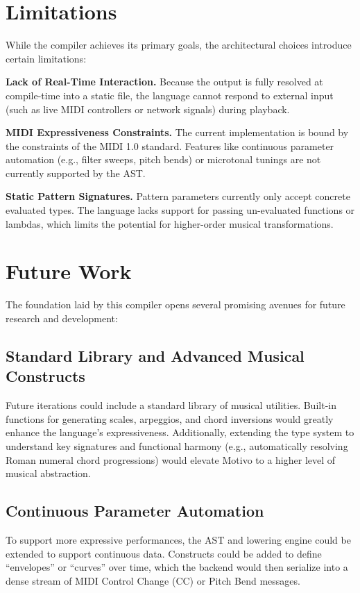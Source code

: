 \section{Limitations}\label{detail-sec:limitations}

While the compiler achieves its primary goals, the architectural choices introduce certain limitations:

\noindent \textbf{Lack of Real-Time Interaction.} Because the output is fully resolved at compile-time into a
static file,
the language cannot respond to external input (such as live MIDI controllers or network signals) during playback.

\noindent \textbf{MIDI Expressiveness Constraints.} The current implementation is bound by the constraints of
the MIDI 1.0
standard.
Features like continuous parameter automation (e.g., filter sweeps, pitch bends) or microtonal tunings are not
currently supported by the AST\@.

\noindent \textbf{Static Pattern Signatures.} Pattern parameters currently only accept concrete evaluated types.
The language lacks support for passing un-evaluated functions or lambdas, which limits the potential for
higher-order musical transformations.

\section{Future Work}\label{detail-sec:future-work}

The foundation laid by this compiler opens several promising avenues for future research and development:

\subsection{Standard Library and Advanced Musical
Constructs}\label{detail-subsec:standard-library-and-advanced-musical-constructs}
Future iterations could include a standard library of musical utilities.
Built-in functions for generating scales, arpeggios, and chord inversions would greatly enhance the language's
expressiveness.
Additionally, extending the type system to understand key signatures and functional harmony (e.g., automatically
resolving Roman numeral chord progressions) would elevate Motivo to a higher level of musical abstraction.

\subsection{Continuous Parameter Automation}\label{detail-subsec:continuous-parameter-automation}
To support more expressive performances, the AST and lowering engine could be extended to support continuous data.
Constructs could be added to define ``envelopes'' or ``curves'' over time, which the backend would then serialize into a
dense stream of MIDI Control Change (CC) or Pitch Bend messages.

